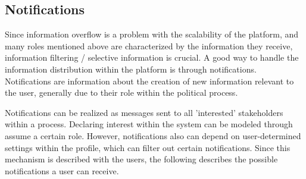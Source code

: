 % 
% 
% 



\subsection{Notifications}
\label{sec:Notifications}
Since information overflow is a problem with the scalability of the platform, and many roles mentioned above are characterized by the information they receive, information filtering / selective information is crucial. A good way to handle the information distribution within the platform is through notifications. Notifications are information about the creation of new information relevant to the user, generally due to their role within the political process.

Notifications can be realized as messages sent to all 'interested' stakeholders within a process. Declaring interest within the system can be modeled through assume a certain role. However, notifications also can depend on user-determined settings within the profile, which can filter out certain notifications. Since this mechanism is described with the users, the following describes the possible notifications a user can receive.

